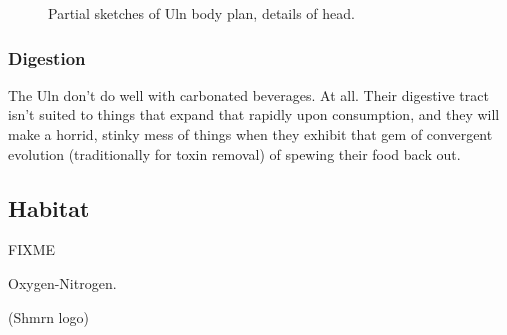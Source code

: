 \begin{figure}
\begin{center}
    \caption{Partial sketches of Uln body plan, details of head.}
    \label{fig:Uln-bodyplan}
\end{center}
\end{figure}


\subsubsection{Digestion}

The Uln don't do well with carbonated beverages. At all. Their
digestive tract isn't suited to things that expand that rapidly upon
consumption, and they will make a horrid, stinky mess of things when
they exhibit that gem of convergent evolution (traditionally for toxin
removal) of spewing their food back out.

\subsection{Habitat}
FIXME 

Oxygen-Nitrogen.

       (Shmrn logo)


